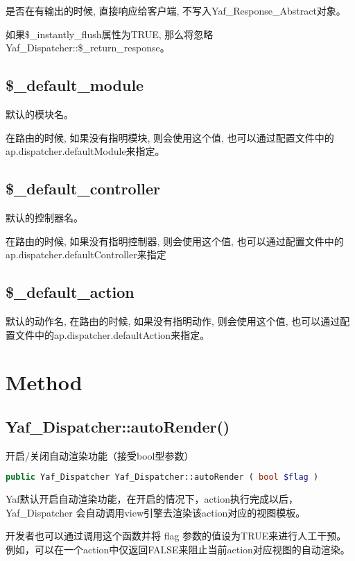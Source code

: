 是否在有输出的时候, 直接响应给客户端, 不写入Yaf\_Response\_Abstract对象。

如果\$\_instantly\_flush属性为TRUE, 那么将忽略Yaf\_Dispatcher::\$\_return\_response。




\subsection{\$\_default\_module}

默认的模块名。

在路由的时候, 如果没有指明模块, 则会使用这个值, 也可以通过配置文件中的ap.dispatcher.defaultModule来指定。


\subsection{\$\_default\_controller}

默认的控制器名。

在路由的时候, 如果没有指明控制器, 则会使用这个值, 也可以通过配置文件中的ap.dispatcher.defaultController来指定

\subsection{\$\_default\_action}

默认的动作名, 在路由的时候, 如果没有指明动作, 则会使用这个值, 也可以通过配置文件中的ap.dispatcher.defaultAction来指定。



\section{Method}


\subsection{Yaf\_Dispatcher::autoRender()}

开启/关闭自动渲染功能（接受bool型参数）

\begin{lstlisting}[language=PHP]
public Yaf_Dispatcher Yaf_Dispatcher::autoRender ( bool $flag )
\end{lstlisting}

Yaf默认开启自动渲染功能，在开启的情况下，action执行完成以后，Yaf\_Dispatcher 会自动调用view引擎去渲染该action对应的视图模板。 

开发者也可以通过调用这个函数并将 flag 参数的值设为TRUE来进行人工干预。例如，可以在一个action中仅返回FALSE来阻止当前action对应视图的自动渲染。


